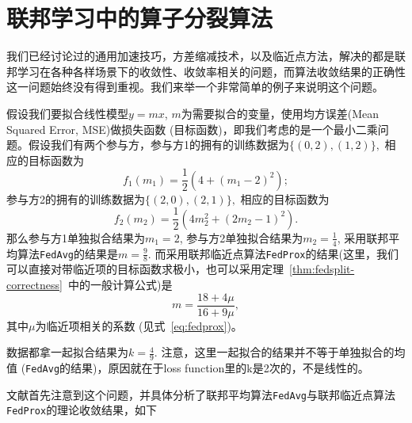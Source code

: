 \section{联邦学习中的算子分裂算法}
\label{sec:chap2-operator-split}

我们已经讨论过的通用加速技巧\cite{reddi2020fed_opt}，方差缩减技术\cite{karimireddy2020scaffold}，以及临近点方法\cite{sahu2018fedprox}，解决的都是联邦学习在各种各样场景下的收敛性、收敛率相关的问题，而算法收敛结果的正确性这一问题始终没有得到重视。我们来举一个非常简单的例子来说明这个问题。

\begin{example}
\label{eg:correctness}
假设我们要拟合线性模型$y = mx$, $m$为需要拟合的变量，使用均方误差(Mean Squared Error, MSE)做损失函数 (目标函数)，即我们考虑的是一个最小二乘问题。假设我们有两个参与方，参与方1的拥有的训练数据为$\{ (0, 2), (1, 2) \},$ 相应的目标函数为
\begin{equation*}
f_1(m_1) = \frac{1}{2} (4 + (m_1 - 2)^2);
\end{equation*}
参与方2的拥有的训练数据为$\{ (2, 0), (2, 1) \},$ 相应的目标函数为
\begin{equation*}
f_2(m_2) = \frac{1}{2} (4m_2^2 + (2m_2 - 1)^2).
\end{equation*}
那么参与方1单独拟合结果为$m_1 = 2$, 参与方2单独拟合结果为$m_2 = \frac{1}{4}$, 采用联邦平均算法\texttt{FedAvg}的结果是$m = \frac{9}{8}.$ 而采用联邦临近点算法\texttt{FedProx}的结果(这里，我们可以直接对带临近项的目标函数求极小，也可以采用定理~\ref{thm:fedsplit-correctness}~中的一般计算公式)是
\begin{equation}
\label{eq:eg-correctness-fedprox}
m = \frac{18 + 4\mu}{16 + 9\mu},
\end{equation}
其中$\mu$为临近项相关的系数 (见式~\eqref{eq:fedprox})。

数据都拿一起拟合结果为$k = \frac{4}{9}.$ 注意，这里一起拟合的结果并不等于单独拟合的均值 (\texttt{FedAvg}的结果)，原因就在于loss function里的k是2次的，不是线性的。
\end{example}

文献\cite{pathak2020fedsplit}首先注意到这个问题，并具体分析了联邦平均算法\texttt{FedAvg}与联邦临近点算法\texttt{FedProx}的理论收敛结果，如下

